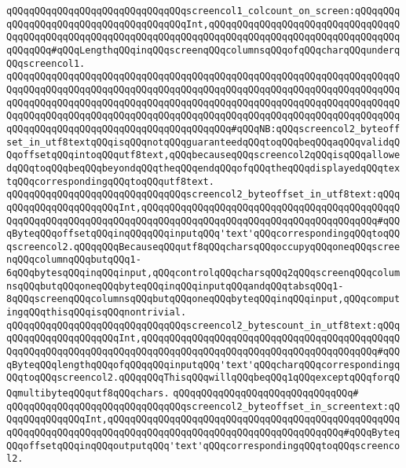 \verb|qQQqqQQqqQQqqQQqqQQqqQQqqQQqqQQqscreencol1_colcount_on_screen:qQQqqQQqqQQqqQQqqQQqqQQqqQQqqQQqqQQqqQQqInt,qQQqqQQqqQQqqQQqqQQqqQQqqQQqqQQqqQQqqQQqqQQqqQQqqQQqqQQqqQQqqQQqqQQqqQQqqQQqqQQqqQQqqQQqqQQqqQQqqQQqqQQqqQQqqQQq#qQQqLengthqQQqinqQQqscreenqQQqcolumnsqQQqofqQQqcharqQQqunderqQQqscreencol1.|\newline
\newline
\newline
\verb|qQQqqQQqqQQqqQQqqQQqqQQqqQQqqQQqqQQqqQQqqQQqqQQqqQQqqQQqqQQqqQQqqQQqqQQqqQQqqQQqqQQqqQQqqQQqqQQqqQQqqQQqqQQqqQQqqQQqqQQqqQQqqQQqqQQqqQQqqQQqqQQqqQQqqQQqqQQqqQQqqQQqqQQqqQQqqQQqqQQqqQQqqQQqqQQqqQQqqQQqqQQqqQQqqQQqqQQqqQQqqQQqqQQqqQQqqQQqqQQqqQQqqQQqqQQqqQQqqQQqqQQqqQQqqQQqqQQqqQQqqQQqqQQqqQQqqQQqqQQqqQQqqQQqqQQqqQQqqQQq#qQQqNB:qQQqscreencol2_byteoffset_in_utf8textqQQqisqQQqnotqQQqguaranteedqQQqtoqQQqbeqQQqaqQQqvalidqQQqoffsetqQQqintoqQQqutf8text,qQQqbecauseqQQqscreencol2qQQqisqQQqallowedqQQqtoqQQqbeqQQqbeyondqQQqtheqQQqendqQQqofqQQqtheqQQqdisplayedqQQqtextqQQqcorrespondingqQQqtoqQQqutf8text.|\newline
\verb|qQQqqQQqqQQqqQQqqQQqqQQqqQQqqQQqscreencol2_byteoffset_in_utf8text:qQQqqQQqqQQqqQQqqQQqqQQqInt,qQQqqQQqqQQqqQQqqQQqqQQqqQQqqQQqqQQqqQQqqQQqqQQqqQQqqQQqqQQqqQQqqQQqqQQqqQQqqQQqqQQqqQQqqQQqqQQqqQQqqQQqqQQqqQQq#qQQqByteqQQqoffsetqQQqinqQQqqQQqinputqQQq'text'qQQqcorrespondingqQQqtoqQQqscreencol2.qQQqqQQqBecauseqQQqutf8qQQqcharsqQQqoccupyqQQqoneqQQqscreenqQQqcolumnqQQqbutqQQq1-6qQQqbytesqQQqinqQQqinput,qQQqcontrolqQQqcharsqQQq2qQQqscreenqQQqcolumnsqQQqbutqQQqoneqQQqbyteqQQqinqQQqinputqQQqandqQQqtabsqQQq1-8qQQqscreenqQQqcolumnsqQQqbutqQQqoneqQQqbyteqQQqinqQQqinput,qQQqcomputingqQQqthisqQQqisqQQqnontrivial.|\newline
\verb|qQQqqQQqqQQqqQQqqQQqqQQqqQQqqQQqscreencol2_bytescount_in_utf8text:qQQqqQQqqQQqqQQqqQQqqQQqInt,qQQqqQQqqQQqqQQqqQQqqQQqqQQqqQQqqQQqqQQqqQQqqQQqqQQqqQQqqQQqqQQqqQQqqQQqqQQqqQQqqQQqqQQqqQQqqQQqqQQqqQQqqQQqqQQq#qQQqByteqQQqlengthqQQqofqQQqqQQqinputqQQq'text'qQQqcharqQQqcorrespondingqQQqtoqQQqscreencol2.qQQqqQQqThisqQQqwillqQQqbeqQQq1qQQqexceptqQQqforqQQqmultibyteqQQqutf8qQQqchars.|\newline
\verb|qQQqqQQqqQQqqQQqqQQqqQQqqQQqqQQq#|\newline
\verb|qQQqqQQqqQQqqQQqqQQqqQQqqQQqqQQqscreencol2_byteoffset_in_screentext:qQQqqQQqqQQqqQQqInt,qQQqqQQqqQQqqQQqqQQqqQQqqQQqqQQqqQQqqQQqqQQqqQQqqQQqqQQqqQQqqQQqqQQqqQQqqQQqqQQqqQQqqQQqqQQqqQQqqQQqqQQqqQQqqQQq#qQQqByteqQQqoffsetqQQqinqQQqoutputqQQq'text'qQQqcorrespondingqQQqtoqQQqscreencol2.|\newline
